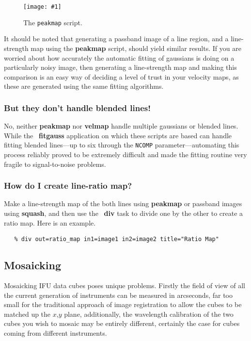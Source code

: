 \documentclass[twoside,11pt]{article}
\newcommand{\htmladdimg}[1]{}
\newcommand{\htmlref}[2]{#1}
\newcommand{\xref}[3]{#1}
\newcommand{\xlabel}[1]{}
\newcommand{\myfig} [5] {
  \begin{figure}
    \centering\texttt{[image: \#1]}
    \typeout{#1 inserted on page \arabic{page}}
    \caption{\label{#4}#5}
  \end{figure}
  }
\newcommand{\myfig}[5]{
    \label{#4} \htmladdimg{#3}\\
    Figure: #5\\
    }
\begin{document}
{\myfig{sc16_peakmap.eps}{height=0.4\textheight}{sc16_peakmap.gif}{sc16_peakmap_fig}{The {\tt peakmap} script.}

It should be noted that generating a \xref{passband
image}{sun237}{passband} of a line region, and a line-strength map
using the {\bf peakmap} script, should yield similar results.  If you
are worried about how accurately the automatic fitting of gaussians is
doing on a particularly noisy image, then generating a line-strength
map and making this comparison is an easy way of deciding a level of
trust in your \htmlref{velocity maps}{sc16_velmap}, as these are
generated using the same fitting algorithms.

\subsubsection{But they don't handle blended lines!}

No, neither \xref{{\bf peakmap}}{sun237}{peakmap} nor \xref{{\bf
velmap}}{sun237}{velmap} handle multiple gaussians or blended lines.
While the \FIGARO\ \xref{{\bf fitgauss}}{sun86}{FITGAUSS} application on
which these scripts are based can handle fitting blended lines---up to
six through the {\tt NCOMP} parameter---automating this process reliably
proved to be extremely difficult and made the fitting routine very
fragile to signal-to-noise problems.

\subsubsection{How do I create line-ratio map?}

Make a line-strength map of the both lines using \xref{{\bf
peakmap}}{sun237}{peakmap} or passband images using \xref{{\bf
squash}}{sun237}{squash}, and then use the \KAPPA\ 
\xref{{\bf div}}{sun95}{DIV} task to divide one by the other to create a
ratio map.  Here is an example.

\small\begin{verbatim}
   % div out=ratio_map in1=image1 in2=image2 title="Ratio Map"
\end{verbatim}\normalsize

\subsection{\xlabel{sc16_mos}Mosaicking\label{sc16_mos}}

Mosaicking IFU data cubes poses unique problems.  Firstly the
field of view of all the current generation of instruments can be
measured in arcseconds, far too small for the traditional approach of
image registration to allow the cubes to be matched up the $x$,$y$
plane, additionally, the wavelength calibration of the two cubes you
wish to mosaic may be entirely different, certainly the case for cubes
coming from different instruments.

}
\end{document}

